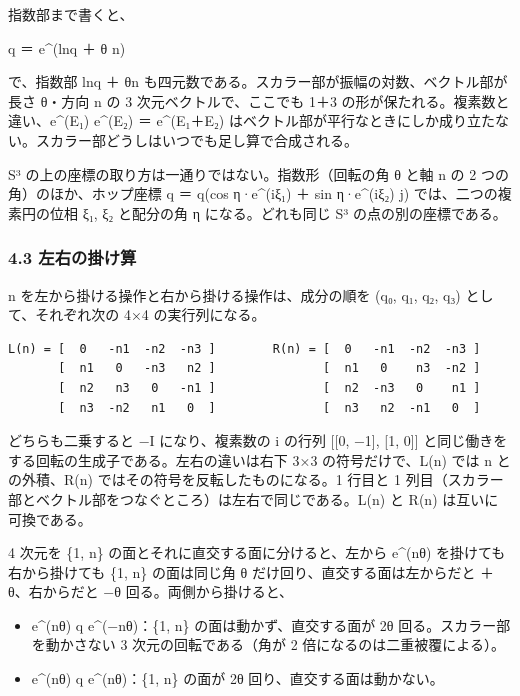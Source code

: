 \documentclass[
  a4paper,
]{ltjsarticle}
\providecommand{\tightlist}{%
  \setlength{\itemsep}{0pt}\setlength{\parskip}{0pt}}
\begin{document}
指数部まで書くと、

q ＝ e\^{}(ln\textbar q\textbar{} ＋ θ n)

で、指数部 ln\textbar q\textbar{} ＋ θn
も四元数である。スカラー部が振幅の対数、ベクトル部が長さ θ・方向 n の 3
次元ベクトルで、ここでも 1＋3 の形が保たれる。複素数と違い、e\^{}(E₁)
e\^{}(E₂) ＝ e\^{}(E₁＋E₂)
はベクトル部が平行なときにしか成り立たない。スカラー部どうしはいつでも足し算で合成される。

S³ の上の座標の取り方は一通りではない。指数形（回転の角 θ と軸 n の 2
つの角）のほか、ホップ座標 q ＝ \textbar q\textbar(cos η·e\^{}(iξ₁) ＋
sin η·e\^{}(iξ₂) j) では、二つの複素円の位相 ξ₁, ξ₂ と配分の角 η
になる。どれも同じ S³ の点の別の座標である。

\subsubsection{4.3
左右の掛け算}\label{ux5de6ux53f3ux306eux639bux3051ux7b97}

n を左から掛ける操作と右から掛ける操作は、成分の順を (q₀, q₁, q₂, q₃)
として、それぞれ次の 4×4 の実行列になる。

\begin{verbatim}
L(n) = [  0   -n1  -n2  -n3 ]        R(n) = [  0   -n1  -n2  -n3 ]
       [  n1   0   -n3   n2 ]               [  n1   0    n3  -n2 ]
       [  n2   n3   0   -n1 ]               [  n2  -n3   0    n1 ]
       [  n3  -n2   n1   0  ]               [  n3   n2  -n1   0  ]
\end{verbatim}

どちらも二乗すると −I になり、複素数の i の行列 {[}{[}0, −1{]}, {[}1,
0{]}{]} と同じ働きをする回転の生成子である。左右の違いは右下 3×3
の符号だけで、L(n) では n との外積、R(n)
ではその符号を反転したものになる。1 行目と 1
列目（スカラー部とベクトル部をつなぐところ）は左右で同じである。L(n) と
R(n) は互いに可換である。

4 次元を \{1, n\} の面とそれに直交する面に分けると、左から e\^{}(nθ)
を掛けても右から掛けても \{1, n\} の面は同じ角 θ
だけ回り、直交する面は左からだと ＋θ、右からだと −θ
回る。両側から掛けると、

\begin{itemize}
\tightlist
\item
  e\^{}(nθ) q e\^{}(−nθ)：\{1, n\} の面は動かず、直交する面が 2θ
  回る。スカラー部を動かさない 3 次元の回転である（角が 2
  倍になるのは二重被覆による）。
\item
  e\^{}(nθ) q e\^{}(nθ)：\{1, n\} の面が 2θ 回り、直交する面は動かない。
\end{itemize}
\end{document}
